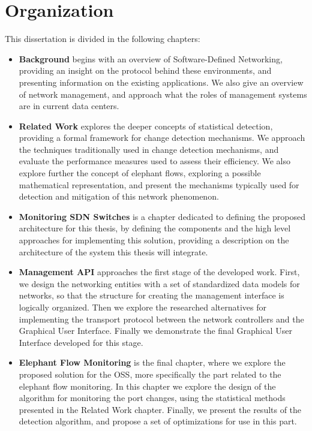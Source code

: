 \section{Organization}


This dissertation is divided in the following chapters:

\begin{itemize}
    \item \textbf{Background} begins with an overview of Software-Defined Networking, providing an insight on the protocol behind these environments,
and presenting information on the existing applications. We also give an overview of network management, and approach what the roles of management systems are
in current data centers. 

    \item \textbf{Related Work} explores the deeper concepts of statistical detection, providing a formal framework for change detection mechanisms. We approach
the techniques traditionally used in change detection mechanisms, and evaluate the performance measures used to assess their efficiency. We also explore further
the concept of elephant flows, exploring a possible mathematical representation, and present the mechanisms typically used for detection and mitigation of this 
network phenomenon.

    \item \textbf{Monitoring SDN Switches} is a chapter dedicated to defining the proposed architecture for this thesis, by defining the components and the high
level approaches for implementing this solution, providing a description on the architecture of the system this thesis will integrate.

    \item \textbf{Management API} approaches the first stage of the developed work. First, we design the networking entities with a set of standardized data models
for networks, so that the structure for creating the management interface is logically organized. Then we explore the researched alternatives for implementing
the transport protocol between the network controllers and the Graphical User Interface. Finally we demonstrate the final Graphical User Interface developed for 
this stage. 

    \item \textbf{Elephant Flow Monitoring} is the final chapter, where we explore the proposed solution for the OSS, more specifically the part related to the 
elephant flow monitoring. In this chapter we explore the design of the algorithm for monitoring the port changes, using the statistical methods presented in 
the Related Work chapter. Finally, we present the results of the detection algorithm, and propose a set of optimizations for use in this part.
\end{itemize}
